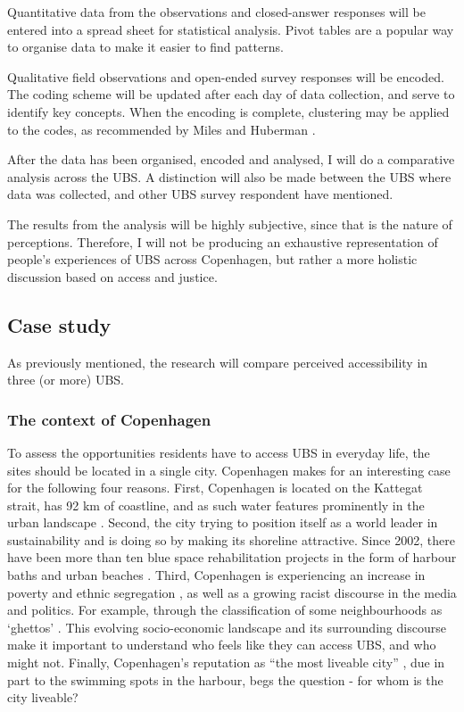 \documentclass{article}
\begin{document}
Quantitative data from the observations and closed-answer responses will be entered into a spread sheet for statistical analysis. Pivot tables are a popular way to organise data to make it easier to find patterns.

Qualitative field observations and open-ended survey responses will be encoded. The coding scheme will be updated after each day of data collection, and serve to identify key concepts. When the encoding is complete, clustering may be applied to the codes, as recommended by Miles and Huberman \parencite{miles1994qualitative}.

After the data has been organised, encoded and analysed, I will do a comparative analysis across the UBS. A distinction will also be made between the UBS where data was collected, and other UBS  survey respondent have mentioned. 


The results from the analysis will be highly subjective, since that is the nature of perceptions. Therefore, I will not be producing an exhaustive representation of people's experiences of UBS across Copenhagen, but rather a more holistic discussion based on access and justice.

\subsection{Case study}

As previously mentioned, the research will compare perceived accessibility in three (or more) UBS.

\subsubsection{The context of Copenhagen}

To assess the opportunities residents have to access UBS in everyday life, the sites should be located in a single city. Copenhagen makes for an interesting case for the following four reasons. First, Copenhagen is located on the Kattegat strait, has 92 km of coastline, and as such water features prominently in the urban landscape  \parencite{comertler2017greens}. Second, the city trying to position itself as a world leader in sustainability and is doing so by making its shoreline attractive. Since  2002, there have been more than ten blue space rehabilitation projects in the form of harbour baths and urban beaches \parencite{visitcopenhagen_baths}. Third, Copenhagen is experiencing an increase in poverty and ethnic segregation \parencite{moller2015socioeconomic}, as well as a growing racist discourse in the media and politics. For example, through the classification of some neighbourhoods as ‘ghettos’ \parencite{simonsen2008practice}. This evolving socio-economic landscape and its surrounding discourse make it important to understand who feels like they can access UBS, and who might not. Finally, Copenhagen’s reputation as “the most liveable city” \parencite{visitdenmark_2021}, due in part to the swimming spots in the harbour, begs the question - for whom is the city liveable?
\end{document}
